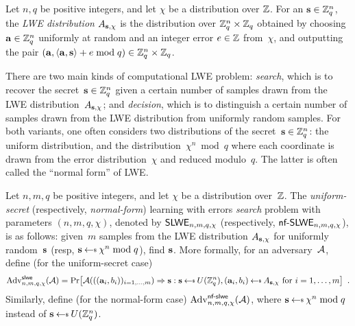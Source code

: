 \begin{definition}%
  \label{def:lwe-distrib}
  Let $n, q$ be positive integers, and let $\chi$ be a distribution
  over $\mathbb{Z}$.  For an $\mathbf{s} \in \mathbb{Z}_q^n$, the \emph{LWE
    distribution} $A_{\mathbf{s}, \chi}$ is the distribution over
  $\mathbb{Z}_q^n \times \mathbb{Z}_q$ obtained by choosing $\mathbf{a} \in \mathbb{Z}_q^n$
  uniformly at random and an integer error $e \in \mathbb{Z}$ from~$\chi$,
  and outputting the pair
  $(\mathbf{a}, \langle\mathbf{a}, \mathbf{s}\rangle + e \bmod q) \in \mathbb{Z}_q^n \times \mathbb{Z}_q$.
\end{definition}

There are two main kinds of computational LWE problem: \emph{search},
which is to recover the secret~$\mathbf{s} \in \mathbb{Z}_{q}^{n}$ given a certain
number of samples drawn from the LWE distribution~$A_{\mathbf{s}, \chi}$;
and \emph{decision}, which is to distinguish a certain number of
samples drawn from the LWE distribution from uniformly random samples.
For both variants, one often considers two distributions of the
secret~$\mathbf{s} \in \mathbb{Z}_{q}^{n}$: the uniform distribution, and the
distribution~$\chi^{n} \bmod{q}$ where each coordinate is drawn from
the error distribution~$\chi$ and reduced modulo~$q$. The latter is
often called the ``normal form'' of LWE.

\begin{definition}%
  \label{def:slweproblem}
  Let $n, m, q$ be positive integers, and let $\chi$ be a distribution
  over~$\mathbb{Z}$.  The \emph{uniform-secret} (respectively,
  \emph{normal-form}) learning with errors \emph{search} problem with
  parameters $(n, m, q, \chi)$, denoted by $\textsf{\upshape\mdseries SLWE}_{n,m,q,\chi}$
  (respectively, $\textsf{\upshape\mdseries nf-SLWE}_{n,m,q,\chi}$), is as follows: given~$m$
  samples from the LWE distribution $A_{\mathbf{s}, \chi}$ for uniformly
  random~$\mathbf{s}$ (resp, $\bfs \getsr \chi^{n} \bmod q$), find $\mathbf{s}$.
  More formally, for an adversary~$\mathcal{A}$, define (for the
  uniform-secret case)
  \[ \Adv{\slwe}{n,m,q,\chi}(\Adversary) = \Pr \bracks*{
      \Adversary(((\bfa_i, b_{i}))_{i=1,\ldots,m}) \Rightarrow \bfs
      : \bfs \getsr U(\bbZ_q^n), (\bfa_{i}, b_{i}) \getsr A_{\bfs,
        \chi} \text{ for } i=1,\ldots,m } \enspace . \] Similarly,
  define (for the normal-form case)
  $\mathrm{Adv}^{\textsf{\upshape\mdseries \textsf{\upshape\mdseries nf-slwe}}}_{n,m,q,\chi}(\mathcal{A})$, where
  $\bfs \getsr \chi^{n} \bmod q$ instead of
  $\bfs \getsr U(\bbZ_{q}^{n})$.
\end{definition}


